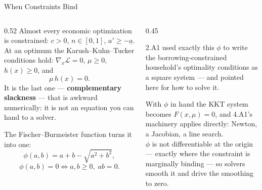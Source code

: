 \begin{frame}{When Constraints Bind}
\begin{columns}[T]
\begin{column}{0.52\textwidth}
\small
Almost every economic optimization is constrained: $c>0$, $n\in[0,1]$, $a'\ge-\underline a$. At an optimum the Karush--Kuhn--Tucker conditions hold:
$\nabla_x\mathcal{L}=0$, $\mu\ge0$, $h(x)\ge0$, and
\[
  \mu\,h(x)=0 .
\]
It is the last one --- \textbf{complementary slackness} --- that is awkward numerically: it is not an equation you can hand to a solver.
\medskip

The Fischer--Burmeister function turns it into one:
\[
  \phi(a,b)=a+b-\sqrt{a^{2}+b^{2}},
\]
\vspace{-3mm}
\[
  \phi(a,b)=0 \iff a,b\ge0,\; ab=0 .
\]
\end{column}
\begin{column}{0.45\textwidth}
\begin{conceptbox}[title=\textbf{Where you met this}]\small
2.A1 used exactly this $\phi$ to write the borrowing-constrained household's optimality conditions as a square system --- and pointed here for how to solve it.
\end{conceptbox}
\medskip
\begin{takeawaybox}\footnotesize
With $\phi$ in hand the KKT system becomes $F(x,\mu)=0$, and 4.A1's machinery applies directly: Newton, a Jacobian, a line search.\\[1mm]
$\phi$ is not differentiable at the origin --- exactly where the constraint is marginally binding --- so solvers smooth it and drive the smoothing to zero.
\end{takeawaybox}
\end{column}
\end{columns}
\vspace{1mm}
\end{frame}

